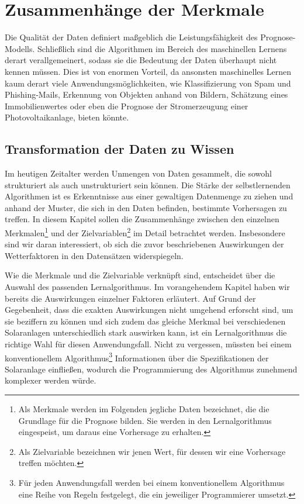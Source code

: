\documentclass[12pt, a4paper]{article}
\begin{document}
\newpage

\section{Zusammenhänge der Merkmale}
\label{sec:features}

Die Qualität der Daten definiert maßgeblich die Leistungsfähigkeit des Prognose-Modells. Schließlich sind die Algorithmen im Bereich des maschinellen Lernens derart verallgemeinert, sodass sie die Bedeutung der Daten überhaupt nicht kennen müssen. Dies ist von enormen Vorteil, da ansonsten maschinelles Lernen kaum derart viele Anwendungsmöglichkeiten, wie Klassifizierung von Spam und Phishing-Mails, Erkennung von Objekten anhand von Bildern, Schätzung eines Immobilienwertes oder eben die Prognose der Stromerzeugung einer Photovoltaikanlage, bieten könnte.

\subsection{Transformation der Daten zu Wissen}

Im heutigen Zeitalter werden Unmengen von Daten gesammelt, die sowohl strukturiert als auch unstrukturiert sein können. Die Stärke der selbstlernenden Algorithmen ist es Erkenntnisse aus einer gewaltigen Datenmenge zu ziehen und anhand der Muster, die sich in den Daten befinden, bestimmte Vorhersagen zu treffen. In diesem Kapitel sollen die Zusammenhänge zwischen den einzelnen Merkmalen\footnote{Als Merkmale werden im Folgenden jegliche Daten bezeichnet, die die Grundlage für die Prognose bilden. Sie werden in den Lernalgorithmus eingespeist, um daraus eine Vorhersage zu erhalten.} und der Zielvariablen\footnote{Als Zielvariable bezeichnen wir jenen Wert, für dessen wir eine Vorhersage treffen möchten.} im Detail betrachtet werden. Insbesondere sind wir daran interessiert, ob sich die zuvor beschriebenen Auswirkungen der Wetterfaktoren in den Datensätzen widerspiegeln.

Wie die Merkmale und die Zielvariable verknüpft sind, entscheidet über die Auswahl des passenden Lernalgorithmus. Im vorangehendem Kapitel haben wir bereits die Auswirkungen einzelner Faktoren erläutert. Auf Grund der Gegebenheit, dass die exakten Auswirkungen nicht umgehend erforscht sind, um sie beziffern zu können und sich zudem das gleiche Merkmal bei verschiedenen Solaranlagen unterschiedlich stark auswirken kann, ist ein Lernalgorithmus die richtige Wahl für diesen Anwendungsfall. Nicht zu vergessen, müssten bei einem konventionellem Algorithmus\footnote{Für jeden Anwendungsfall werden bei einem konventionellem Algorithmus eine Reihe von Regeln festgelegt, die ein jeweiliger Programmierer umsetzt.} Informationen über die Spezifikationen der Solaranlage einfließen, wodurch die Programmierung des Algorithmus zunehmend komplexer werden würde.
\end{document}
